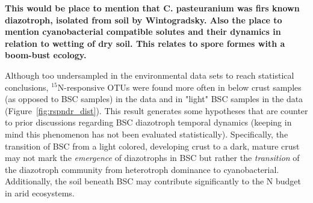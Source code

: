 \textbf{This would be place to mention that C. pasteuranium was firs known
diazotroph, isolated from soil by Wintogradsky. Also the place to mention
cyanobacterial compatible solutes and their dynamics in relation to wetting of
dry soil. This relates to spore formes with a boom-bust ecology.}

Although too undersampled in the environmental data sets to reach statistical
conclusions, $^{15}$N-responsive OTUs were found more often in below
crust samples (as opposed to BSC samples) in the \citet{Steven_2013} data and
in "light" BSC samples in the \citet{Garcia_Pichel_2013} data
(Figure~\ref{fig:rspndr_dist}). This result generates some hypotheses that
are counter to prior discussions regarding BSC diazotroph temporal dynamics
(keeping in mind this phenomenon has not been evaluated statistically).
Specifically, the transition of BSC from a light colored, developing crust to
a dark, mature crust may not mark the \textit{emergence} of diazotrophs in
BSC but rather the \textit{transition} of the diazotroph community from
heterotroph dominance to cyanobacterial.  Additionally, the soil beneath BSC
may contribute significantly to the N budget in arid ecosystems.


